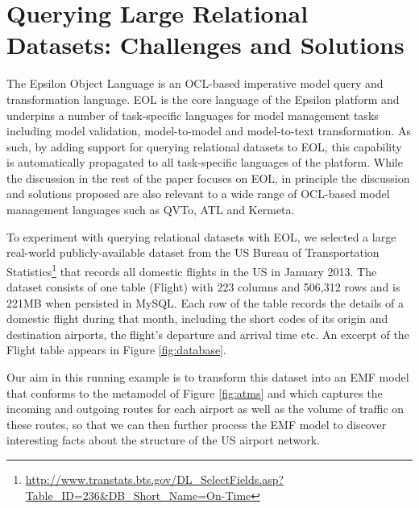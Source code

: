 \section{Querying Large Relational Datasets: Challenges and Solutions}
\label{sec:approach}

The Epsilon Object Language \cite{EOL} is an OCL-based imperative model query and transformation language. EOL is the core language of the Epsilon platform and underpins a number of task-specific languages for model management tasks including model validation, model-to-model and model-to-text transformation. As such, by adding support for querying relational datasets to EOL, this capability is automatically propagated to all task-specific languages of the platform. While the discussion in the rest of the paper focuses on EOL, in principle the discussion and solutions proposed are also relevant to a wide range of OCL-based model management languages such as QVTo, ATL and Kermeta.

To experiment with querying relational datasets with EOL, we selected a large real-world publicly-available dataset from the US Bureau of Transportation Statistics\footnote{\url{http://www.transtats.bts.gov/DL_SelectFields.asp?Table_ID=236&DB_Short_Name=On-Time}} that records all domestic flights in the US in January 2013. The dataset consists of one table (Flight) with 223 columns and 506,312 rows and is 221MB when persisted in MySQL. Each row of the table records the details of a domestic flight during that month, including the short codes of its origin and destination airports, the flight's departure and arrival time etc. An excerpt of the Flight table appears in Figure \ref{fig:database}. 

Our aim in this running example is to transform this dataset into an EMF model that conforms to the metamodel of Figure \ref{fig:atms} and which captures the incoming and outgoing routes for each airport as well as the volume of traffic on these routes, so that we can then further process the EMF model to discover interesting facts about the structure of the US airport network.

